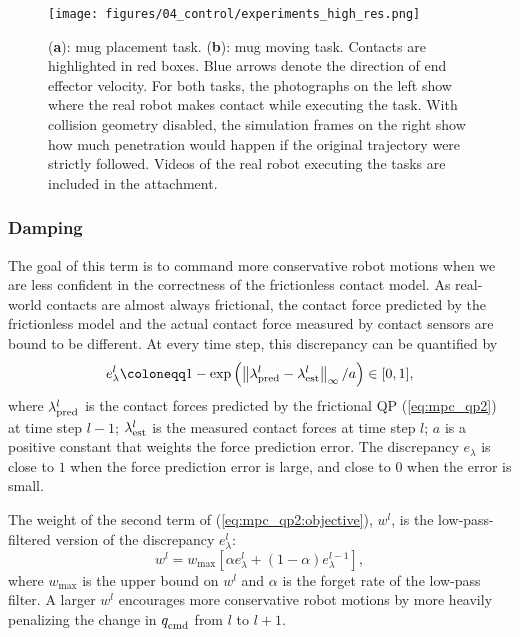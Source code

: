 \begin{figure}[t!]
\centering
\texttt{[image: figures/04\_control/experiments\_high\_res.png]}
\caption{(\textbf{a}): mug placement task. (\textbf{b}): mug moving task. Contacts are highlighted in red boxes. Blue arrows denote the direction of end effector velocity. For both tasks, the photographs on the left show where the real robot makes contact while executing the task. With collision geometry disabled, the simulation frames on the right show how much penetration would happen if the original trajectory were strictly followed. Videos of the real robot executing the tasks are included in the attachment.}
\label{fig:experiments}
\end{figure}


\subsubsection{Damping} 
The goal of this term is to command more conservative robot motions when we are less confident in the correctness of the frictionless contact model. As real-world contacts are almost always frictional, the contact force predicted by the frictionless model and the actual contact force measured by contact sensors are bound to be different. At every time step, this discrepancy can be quantified by
\begin{equation}
e_\lambda^l \coloneqq 1 - \exp{\left(\left\|\lambda_{\rm pred}^l -\lambda_{\rm est}^l \right\|_{\infty}/a\right)} \in [0, 1],
\end{equation}
where $\lambda_{\rm pred}^l$ is the contact forces predicted by the frictional QP (\ref{eq:mpc_qp2}) at time step $l - 1$; $\lambda_{\rm est}^l$ is the measured contact forces at time step $l$; $a$ is a positive constant that weights the force prediction error. The discrepancy $e_\lambda$ is close to $1$ when the force prediction error is large, and close to $0$ when the error is small.

The weight of the second term of (\ref{eq:mpc_qp2:objective}), $w^l$, is the low-pass-filtered version of the discrepancy $e_\lambda^l$:
\begin{equation}
w^l = w_\text{max} \left[ \alpha e_\lambda^l + (1 - \alpha) e_\lambda^{l-1} \right],
\end{equation}
where $w_\text{max}$ is the upper bound on $w^l$ and $\alpha$ is the forget rate of the low-pass filter. A larger $w^l$ encourages more conservative robot motions by more heavily penalizing the change in $q_{\text{cmd}}^{}$ from $l$ to $l+1$.


